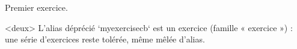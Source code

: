 \begin{exercise}
  Premier exercice.
\end{exercise}

\begin{myexercisecb}<deux>
  L'alias déprécié `myexercisecb` est un exercice (famille « exercice ») :
  une série d'exercices reste tolérée, même mêlée d'alias.
\end{myexercisecb}
